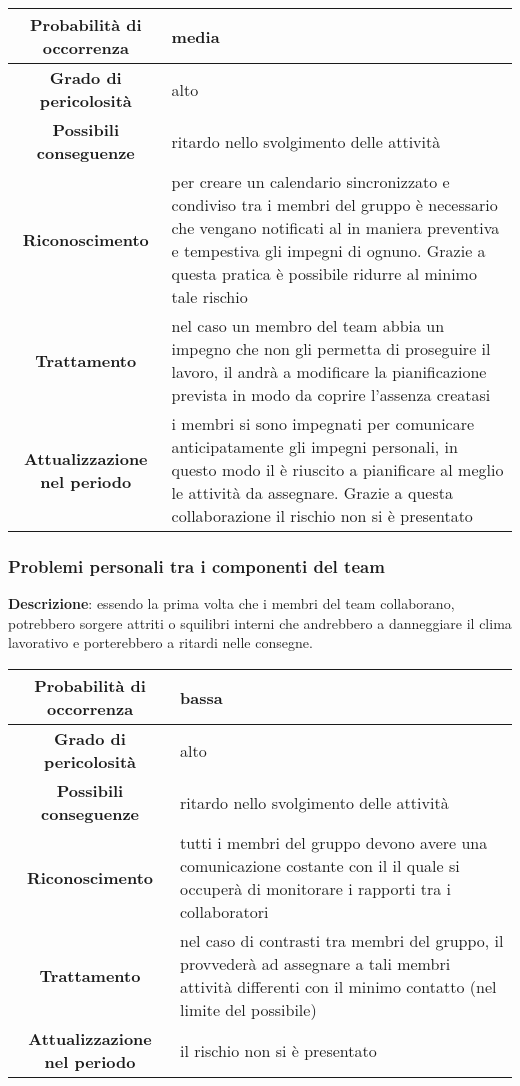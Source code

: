 \documentclass[PianoDiProgetto.tex]{subfiles}
\begin{document}
		\begin{center}
			\begin{tabular}{ | c | p{10cm} |}
				\hline
				\textbf{Probabilità di occorrenza} & media  \\ \hline
				\textbf{Grado di pericolosità} & alto \\ \hline
				\textbf{Possibili conseguenze} & ritardo nello svolgimento delle attività \\ \hline
				\textbf{Riconoscimento} &per creare un calendario sincronizzato e condiviso tra i membri del gruppo è necessario che vengano notificati al \RESP{} in maniera preventiva e tempestiva gli impegni di ognuno. Grazie a questa pratica è possibile ridurre al minimo tale rischio \\ \hline
				\textbf{Trattamento} & nel caso un membro del team abbia un impegno che non gli permetta di proseguire il lavoro, il \RESP{} andrà a modificare la pianificazione prevista in modo da coprire l'assenza creatasi \\ \hline
				\textbf{Attualizzazione nel periodo} &  i membri si sono impegnati per comunicare anticipatamente gli impegni personali, in questo modo il \RESP{} è riuscito a pianificare al meglio le attività da assegnare. Grazie a questa collaborazione il rischio non si è presentato \\
				\hline	
			\end{tabular}
		\end{center}		
			
		\subsubsection{Problemi personali tra i componenti del team}
			\label{sec:pptc}
			
			\textbf{Descrizione}: essendo la prima volta che i membri del team collaborano, potrebbero sorgere attriti o squilibri interni che andrebbero a danneggiare il clima lavorativo e porterebbero a ritardi nelle consegne.
			
			\begin{center}
				\begin{tabular}{ | c | p{10cm} |}
					\hline
					\textbf{Probabilità di occorrenza} & bassa  \\ \hline
					\textbf{Grado di pericolosità} & alto \\ \hline
					\textbf{Possibili conseguenze} & ritardo nello svolgimento delle attività \\ \hline
					\textbf{Riconoscimento} & tutti i membri del gruppo devono avere una comunicazione costante con il \RESP{} il quale si occuperà di monitorare i rapporti tra i collaboratori \\ \hline
					\textbf{Trattamento} & nel caso di contrasti tra membri del gruppo, il \RESP{} provvederà ad assegnare a tali membri attività differenti con il minimo contatto (nel limite del possibile) \\ \hline
					\textbf{Attualizzazione nel periodo} & il rischio non si è presentato \\
					\hline	
				\end{tabular}
			\end{center}		
	
\end{document}
